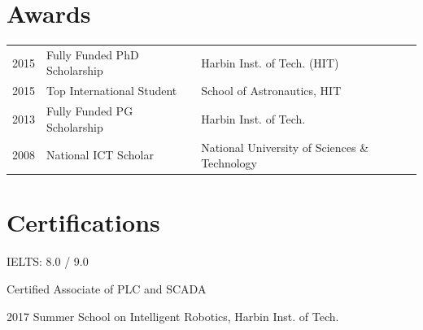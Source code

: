\documentclass[a4paper]{deedy-resume} %
\begin{document}
\begin{minipage}[t]{0.66\textwidth}
\section{Awards} 

\begin{tabular}{rll}
2015 & Fully Funded PhD Scholarship & Harbin Inst. of Tech. (HIT) \\
2015 & Top International Student & School of Astronautics, HIT \\
2013 & Fully Funded PG Scholarship & Harbin Inst. of Tech. \\
2008 & National ICT Scholar & National University of Sciences \& Technology
\end{tabular}

\sectionspace %


\section{Certifications}

\vspace{\topsep} %

\begin{tightitemize}
	\item IELTS: 8.0 / 9.0
	\item Certified Associate of PLC and SCADA
	\item 2017 Summer School on Intelligent Robotics, Harbin Inst. of Tech.
\end{tightitemize}






\end{minipage} %
\end{document}
